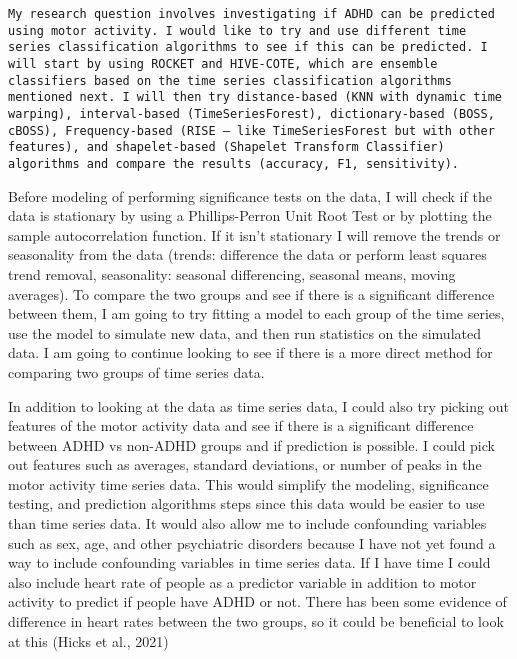 \documentclass[,article,submit,moreauthors,pdftex]{mdpi}
\begin{document}
\begin{verbatim}
My research question involves investigating if ADHD can be predicted using motor activity. I would like to try and use different time series classification algorithms to see if this can be predicted. I will start by using ROCKET and HIVE-COTE, which are ensemble classifiers based on the time series classification algorithms mentioned next. I will then try distance-based (KNN with dynamic time warping), interval-based (TimeSeriesForest), dictionary-based (BOSS, cBOSS), Frequency-based (RISE — like TimeSeriesForest but with other features), and shapelet-based (Shapelet Transform Classifier) algorithms and compare the results (accuracy, F1, sensitivity). 
\end{verbatim}

Before modeling of performing significance tests on the data, I will
check if the data is stationary by using a Phillips-Perron Unit Root
Test or by plotting the sample autocorrelation function. If it isn't
stationary I will remove the trends or seasonality from the data
(trends: difference the data or perform least squares trend removal,
seasonality: seasonal differencing, seasonal means, moving averages). To
compare the two groups and see if there is a significant difference
between them, I am going to try fitting a model to each group of the
time series, use the model to simulate new data, and then run statistics
on the simulated data. I am going to continue looking to see if there is
a more direct method for comparing two groups of time series data.

In addition to looking at the data as time series data, I could also try
picking out features of the motor activity data and see if there is a
significant difference between ADHD vs non-ADHD groups and if prediction
is possible. I could pick out features such as averages, standard
deviations, or number of peaks in the motor activity time series data.
This would simplify the modeling, significance testing, and prediction
algorithms steps since this data would be easier to use than time series
data. It would also allow me to include confounding variables such as
sex, age, and other psychiatric disorders because I have not yet found a
way to include confounding variables in time series data. If I have time
I could also include heart rate of people as a predictor variable in
addition to motor activity to predict if people have ADHD or not. There
has been some evidence of difference in heart rates between the two
groups, so it could be beneficial to look at this (Hicks et al., 2021)
\end{document}
